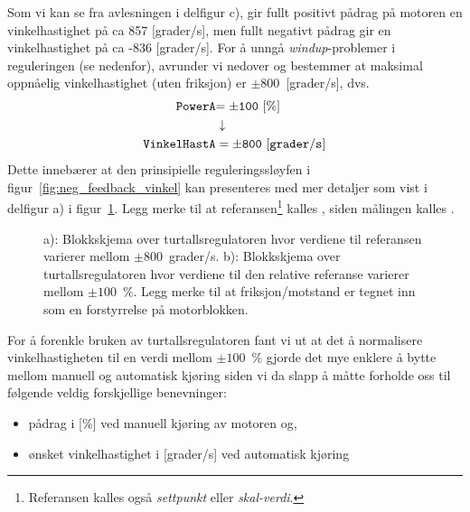 Som vi kan se fra avlesningen i delfigur c), gir fullt positivt pådrag på motoren en
vinkelhastighet på ca 857 [grader/s], men fullt negativt pådrag gir en
vinkelhastighet på ca -836 [grader/s]. For å unngå {\em
  windup}-problemer i reguleringen (se nedenfor), avrunder vi nedover
og bestemmer at maksimal oppnåelig vinkelhastighet (uten friksjon) er $\pm 800$~[grader/s], dvs.
\begin{align}
  \mathtt{PowerA}&\mathtt{=\pm 100~[\%]} \notag \\
  &\downarrow \notag \\
  \mathtt{VinkelHastA}&=\mathtt{\pm 800~[grader/s]} \notag
\end{align}
Dette innebærer at den prinsipielle reguleringssløyfen i
figur~\ref{fig:neg_feedback_vinkel}
kan presenteres med mer detaljer som vist i
delfigur a) i figur~\ref{fig:reg_sloyfe1}. Legg merke til at
referansen\footnote{Referansen kalles også 
{\em settpunkt} eller {\em skal-verdi}.}
kalles , siden målingen 
kalles .

\begin{figure}[H]
  \centering
  \hspace*{-15mm}
  \caption{a): Blokkskjema over turtallsregulatoren hvor verdiene til 
    referansen  varierer mellom $\pm
    800$~grader/s. b): Blokkskjema over turtallsregulatoren hvor verdiene til 
    den relative referanse  varierer mellom $\pm
    100$~\%. Legg merke til at friksjon/motstand er tegnet inn som en
    forstyrrelse på motorblokken.
    } 
  \label{fig:reg_sloyfe1}
\end{figure}
For å forenkle bruken av turtallsregulatoren fant vi ut at det å
normalisere vinkelhastigheten til en verdi mellom $\pm100$~\% gjorde
det mye enklere å bytte mellom manuell og automatisk kjøring siden vi
da slapp å måtte forholde oss til følgende veldig forskjellige benevninger:\\[-7mm]
\begin{itemize}
\setlength\itemsep{-1mm}
\item pådrag i [\%] ved manuell kjøring av motoren og, 
\item ønsket vinkelhastighet i [grader/s] ved automatisk kjøring
\end{itemize}

